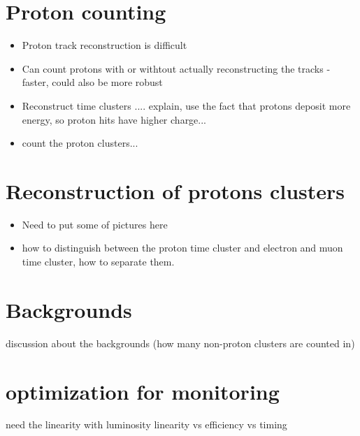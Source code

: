 \documentclass[12pt]{extarticle}
\begin{document}
\section{Proton counting} 
\begin{itemize}
\item   
Proton track reconstruction is difficult \cite{Bastiano_reco}
\item
Can count protons with or withtout actually reconstructing the tracks - faster, could also be more robust
\item
Reconstruct time clusters .... explain, use the fact that protons deposit more energy, so 
proton hits have higher charge...
\item
count the proton clusters...
\end{itemize}

\section {Reconstruction of protons clusters}
\begin{itemize}
\item
Need to put some of pictures here
\item
how to distinguish between the proton time cluster and electron and muon time cluster, how to separate them.
\end{itemize}

\section{Backgrounds}

discussion about the backgrounds 
(how many non-proton clusters are counted in)

\section {optimization for monitoring}
need the linearity with luminosity
linearity vs efficiency vs timing 
\end{document}
